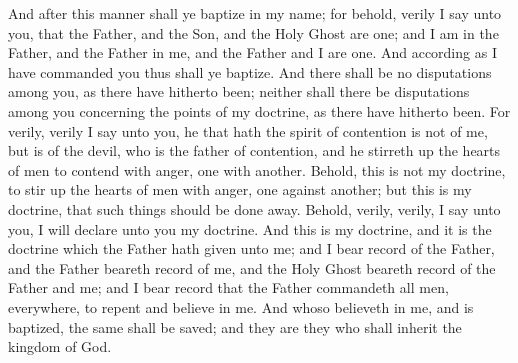 And after this manner shall ye baptize in my name; for behold, verily I say unto you, that the Father, and the Son, and the Holy Ghost are one; and I am in the Father, and the Father in me, and the Father and I are one.
\bverse \iffalse And according as I have commanded you thus shall ye baptize.  And there shall be no disputations among you, as there have hitherto been; neither shall there be disputations among you concerning the points of my doctrine, as there have hitherto been. \fi
And according as I have commanded you thus shall ye baptize.  And there shall be no disputations among you, as there have hitherto been; neither shall there be disputations among you concerning the points of my doctrine, as there have hitherto been.
\bverse \iffalse For verily, verily I say unto you, he that hath the spirit of contention is not of me, but is of the devil, who is the father of contention, and he stirreth up the hearts of men to contend with anger, one with another. \fi
For verily, verily I say unto you, he that hath the spirit of contention is not of me, but is of the devil, who is the father of contention, and he stirreth up the hearts of men to contend with anger, one with another.
\bverse \iffalse Behold, this is not my doctrine, to stir up the hearts of men with anger, one against another; but this is my doctrine, that such things should be done away. \fi
Behold, this is not my doctrine, to stir up the hearts of men with anger, one against another; but this is my doctrine, that such things should be done away.
\bverse \iffalse Behold, verily, verily, I say unto you, I will declare unto you my doctrine. \fi
Behold, verily, verily, I say unto you, I will declare unto you my doctrine.
\bverse \iffalse And this is my doctrine, and it is the doctrine which the Father hath given unto me; and I bear record of the Father, and the Father beareth record of me, and the Holy Ghost beareth record of the Father and me; and I bear record that the Father commandeth all men, everywhere, to repent and believe in me. \fi
And this is my doctrine, and it is the doctrine which the Father hath given unto me; and I bear record of the Father, and the Father beareth record of me, and the Holy Ghost beareth record of the Father and me; and I bear record that the Father commandeth all men, everywhere, to repent and believe in me.
\bverse \iffalse And whoso believeth in me, and is baptized, the same shall be saved; and they are they who shall inherit the kingdom of God. \fi
And whoso believeth in me, and is baptized, the same shall be saved; and they are they who shall inherit the kingdom of God.
